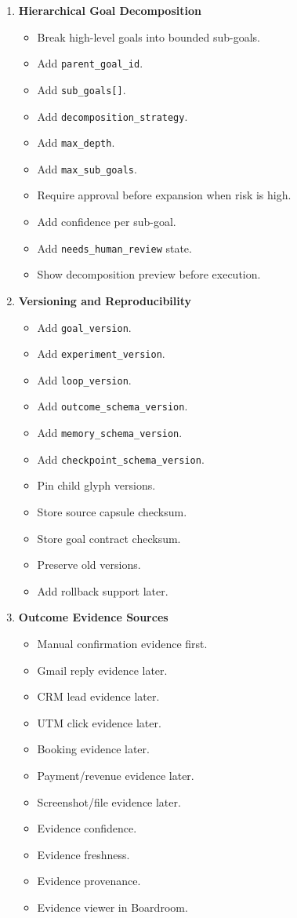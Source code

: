 \begin{enumerate}
  \item \textbf{Hierarchical Goal Decomposition}
  \begin{itemize}
    \item Break high-level goals into bounded sub-goals.
    \item Add \texttt{parent\_goal\_id}.
    \item Add \texttt{sub\_goals[]}.
    \item Add \texttt{decomposition\_strategy}.
    \item Add \texttt{max\_depth}.
    \item Add \texttt{max\_sub\_goals}.
    \item Require approval before expansion when risk is high.
    \item Add confidence per sub-goal.
    \item Add \texttt{needs\_human\_review} state.
    \item Show decomposition preview before execution.
  \end{itemize}

  \item \textbf{Versioning and Reproducibility}
  \begin{itemize}
    \item Add \texttt{goal\_version}.
    \item Add \texttt{experiment\_version}.
    \item Add \texttt{loop\_version}.
    \item Add \texttt{outcome\_schema\_version}.
    \item Add \texttt{memory\_schema\_version}.
    \item Add \texttt{checkpoint\_schema\_version}.
    \item Pin child glyph versions.
    \item Store source capsule checksum.
    \item Store goal contract checksum.
    \item Preserve old versions.
    \item Add rollback support later.
  \end{itemize}

  \item \textbf{Outcome Evidence Sources}
  \begin{itemize}
    \item Manual confirmation evidence first.
    \item Gmail reply evidence later.
    \item CRM lead evidence later.
    \item UTM click evidence later.
    \item Booking evidence later.
    \item Payment/revenue evidence later.
    \item Screenshot/file evidence later.
    \item Evidence confidence.
    \item Evidence freshness.
    \item Evidence provenance.
    \item Evidence viewer in Boardroom.
  \end{itemize}


\end{enumerate}
